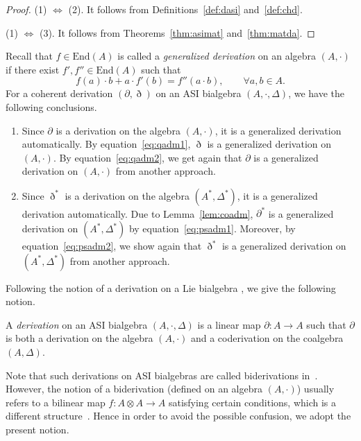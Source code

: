 \documentclass[10pt,a4paper]{amsart}
\numberwithin{equation}{section}
\newcommand{\End}{\mathrm{End}}
\begin{document}
\begin{proof}
(1) $\Longleftrightarrow$ (2). It follows from
Definitions~\ref{def:dasi} and~\ref{def:chd}.

(1) $\Longleftrightarrow$ (3). It follows from
Theorems~\ref{thm:asimat} and~\ref{thm:matda}.
\end{proof}

Recall \cite{KP,leger2000generalized} that $f \in \End(A)$ is called a \textit{generalized derivation} on an algebra $(A, \cdot)$ if there exist $f', f'' \in \End(A)$ such that
\begin{equation*}
	f(a) \cdot b + a \cdot f'(b) = f''(a \cdot b), \qquad \forall a, b \in
	A.
\end{equation*}
For a coherent derivation $(\partial, \eth)$ on an ASI bialgebra $(A, \cdot,
\Delta)$, we have the following conclusions.
\begin{enumerate}\itemsep=0pt
	\item
	Since $\partial$ is a derivation on the algebra $(A,\cdot)$,
	it is a generalized derivation automatically.
	By equation~\eqref{eq:qadm1}, $\eth$ is a generalized derivation on $(A,\cdot)$.
	By equation~\eqref{eq:qadm2}, we get again that $\partial$ is a generalized derivation on $(A,\cdot)$ from another approach.

	\item
	Since $\eth^*$ is a derivation on the algebra $(A^*,\Delta^*)$, it is a generalized derivation automatically.
	Due to Lemma~\ref{lem:coadm}, $\partial^*$ is a generalized derivation on $(A^*, \Delta^*)$ by equation~\eqref{eq:psadm1}.
	Moreover, by equation~\eqref{eq:psadm2}, we show again that $\eth^*$ is a generalized derivation on $(A^*, \Delta^*)$ from another approach.
\end{enumerate}

Following the notion of a derivation on a Lie bialgebra \cite{chari1995guide}, we give the following notion.

\begin{Definition}A \textit{derivation} on an ASI bialgebra $(A, \cdot, \Delta)$ is a linear map $\partial\colon A \to A$ such that
 $\partial$ is both a derivation on the algebra $(A, \cdot)$ and a coderivation on the coalgebra $(A, \Delta)$.
\end{Definition}
Note that such derivations on ASI bialgebras are called biderivations in~\cite{aguiar2004infinitesimal}.
However, the notion of a biderivation (defined on an algebra $(A,\cdot)$) usually refers to a bilinear map ${f\colon A\otimes A \rightarrow A}$ satisfying certain conditions, which is a different structure~\cite{liu2018biderivations}.
Hence in order to avoid the possible confusion, we adopt the present notion.
\end{document}

